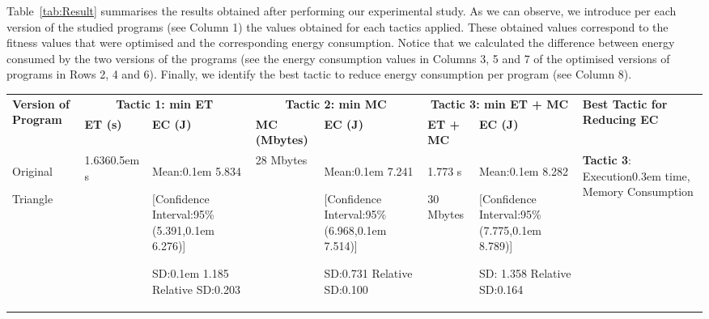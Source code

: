 \vspace{.5em}
Table~\ref{tab:Result} summarises the results obtained after performing our experimental study. As we can observe, 
we introduce per each version of the studied programs (see Column 1) the values obtained for each tactics applied. These obtained values correspond to the fitness values that were optimised and the corresponding energy consumption. Notice that we calculated the difference between energy consumed by the two versions of the programs (see the energy consumption values in Columns 3, 5 and 7 of the optimised versions of programs in Rows 2, 4 and 6). 
Finally, we identify the best tactic to reduce energy consumption per program (see Column 8).


{\footnotesize
\begin{longtable}{|p{1.15cm}|p{1.3cm}|p{1.8cm}|p{1.5cm}|p{1.8cm}|p{1.8cm}|p{1.8cm}|p{2.5cm}|}
  \hline
  \multirow{2}{1.1cm}{\textbf{Version of Program}} 
  & \multicolumn{2}{c|}{\textbf{Tactic 1: min ET}}
  & \multicolumn{2}{c|}{\textbf{Tactic 2: min MC}} 
  & \multicolumn{2}{c|}{\textbf{Tactic 3: min ET + MC}} 
  & \multirow{2}{2.5cm}{\textbf{Best Tactic for Reducing EC}}\\
  
  \cline{2-7}
   & \textbf{ET (s)}  & \textbf{EC (J)} 
  & \textbf{MC (Mbytes)} & \textbf{EC (J)} 
  & \textbf{ET + MC} & \textbf{EC (J)} & \\
  \hline
  
   Original\par Triangle & 
   1.636\kern0.5em s &
   Mean:\kern0.1em 5.834\par \vspace{.5em} [Confidence Interval:95\% (5.391,\kern0.1em 6.276)]\par \vspace{.5em} SD:\kern0.1em 1.185\vspace{.5em} Relative SD:0.203 &
   28 Mbytes &
   Mean:\kern0.1em 7.241\par \vspace{.5em} [Confidence Interval:95\% (6.968,\kern0.1em  7.514)]\par \vspace{.5em} SD:0.731\vspace{.5em} Relative SD:0.100 &
   1.773 s\par \vspace{.5em} 30 Mbytes &
   Mean:\kern0.1em 8.282\par \vspace{.5em} [Confidence Interval:95\% (7.775,\kern0.1em  8.789)]\par \vspace{.5em} SD: 1.358\vspace{.5em} Relative SD:0.164 &
   \textbf{Tactic 3}: Execution\kern0.3em time,
   Memory Consumption\par\\
   

\end{longtable}}
